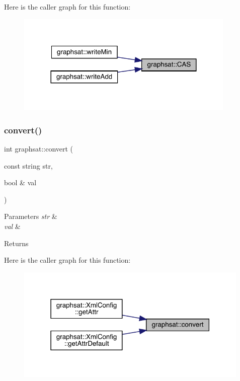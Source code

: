 Here is the caller graph for this function\+:
\nopagebreak
\begin{figure}[H]
\begin{center}
\leavevmode
\includegraphics[width=296pt]{namespacegraphsat_a6ba86c7b7b22c55dc8f404d1928ab71e_icgraph}
\end{center}
\end{figure}
\mbox{\label{namespacegraphsat_a986c3358c4863410e03f7b8c2e4f9387}} 
\subsubsection{\texorpdfstring{convert()}{convert()}\hspace{0.1cm}{\footnotesize\ttfamily [1/4]}}
{\footnotesize\ttfamily int graphsat\+::convert (\begin{DoxyParamCaption}\item[{const string}]{str,  }\item[{bool \&}]{val }\end{DoxyParamCaption})}


\begin{DoxyParams}{Parameters}
{\em str} & \\
\hline
{\em val} & \\
\hline
\end{DoxyParams}
\begin{DoxyReturn}{Returns}

\end{DoxyReturn}
Here is the caller graph for this function\+:
\nopagebreak
\begin{figure}[H]
\begin{center}
\leavevmode
\includegraphics[width=316pt]{namespacegraphsat_a986c3358c4863410e03f7b8c2e4f9387_icgraph}
\end{center}
\end{figure}
\mbox{\label{namespacegraphsat_af4639b646d1b2e4485670e790ee6d182}} 
